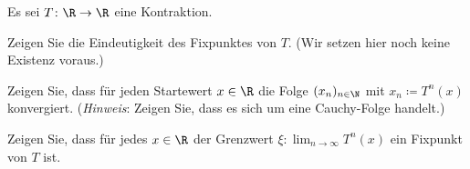 \begin{exsol@exercise}
 Es sei $T \colon \R \to \R$ eine Kontraktion.

 Zeigen Sie die Eindeutigkeit des Fixpunktes von $T$. (Wir setzen hier noch keine Existenz voraus.)

 Zeigen Sie, dass für jeden Startewert $x \in \R$ die Folge $(x_n)_{n \in \N}$ mit $x_n \coloneqq T^n(x)$ konvergiert. (\emph{Hinweis}: Zeigen Sie, dass es sich um eine Cauchy-Folge handelt.)

 Zeigen Sie, dass für jedes $x \in \R$ der Grenzwert $\xi \colon \lim_{n \to \infty} T^n(x)$ ein Fixpunkt von $T$ ist.
\end{exsol@exercise}
